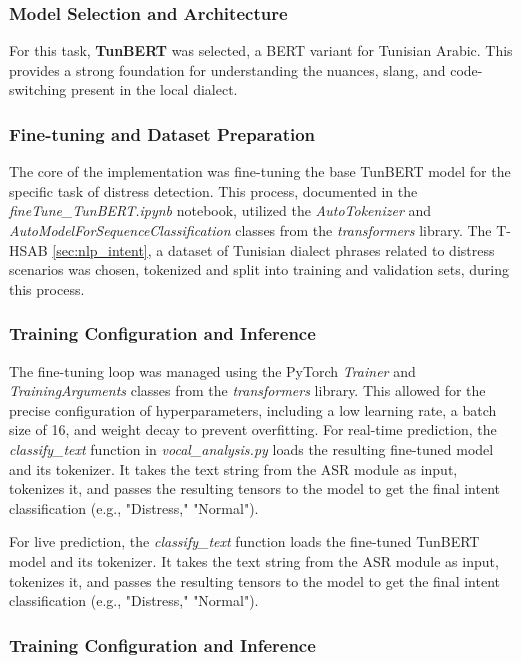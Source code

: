 \documentclass[12pt,a4paper,oneside,english]{book}
\begin{document}
\subsubsection{Model Selection and Architecture}
\label{sec:tunbert selection}
For this task, \textbf{TunBERT} was selected, a BERT variant for Tunisian Arabic. This provides a strong foundation for understanding the nuances, slang, and code-switching present in the local dialect.

\subsubsection{Fine-tuning and Dataset Preparation}
\label{sec:finetuning tunbert}
The core of the implementation was fine-tuning the base TunBERT model for the specific task of distress detection. This process, documented in the \textit{fineTune\_TunBERT.ipynb} notebook, 
utilized the \textit{AutoTokenizer} and \textit{AutoModelForSequenceClassification} classes from the \textit{transformers} library. 
The T- HSAB \ref{sec:nlp_intent}, a dataset of Tunisian dialect phrases related to distress scenarios was chosen, tokenized and split into training and validation sets, during this process. 
\subsubsection{Training Configuration and Inference}
\label{sec:training tunbert}
The fine-tuning loop was managed using the PyTorch \textit{Trainer} and \textit{TrainingArguments} classes from the \textit{transformers} library. This allowed for the precise configuration of 
hyperparameters, including a low learning rate, a batch size of 16, and weight decay to prevent overfitting. For real-time prediction, the \textit{classify\_text} function in \textit{vocal\_analysis.py} 
loads the resulting fine-tuned model and its tokenizer. It takes the text string from the ASR module as input, tokenizes it, and passes the resulting tensors to the model to get the final intent 
classification (e.g., "Distress," "Normal").

For live prediction, the \textit{classify\_text} function loads the fine-tuned TunBERT model and its tokenizer. It takes the text string from the ASR module as input, tokenizes it, and passes the 
resulting tensors to the model to get the final intent classification (e.g., "Distress," "Normal").

\subsubsection{Training Configuration and Inference}
\label{sec:training_tunbert}
\end{document}
